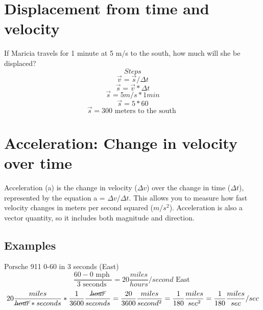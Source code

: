 \documentclass{article}
\theoremstyle{mytheoremstyle}
\theoremstyle{mytheoremstyle}
\theoremstyle{myproblemstyle}
\begin{document}
\section{Displacement from time and velocity}
If Maricia travels for 1 minute at 5 m/s to the south, how much will she be displaced?
$$Steps$$
$$\overrightarrow{v} = \overrightarrow{s}/\Delta{t}$$
$$\overrightarrow{s} = \overrightarrow{v} * \Delta{t}$$
$$\overrightarrow{s} = 5m/s*1min$$
$$\overrightarrow{s} = 5*60$$
$$\overrightarrow{s} = 300 \text { meters to the south }$$
\section{Acceleration: Change in velocity over time}
Acceleration (a) is the change in velocity ($\Delta{v}$) over the change in time ($\Delta{t}$), represented by the equation a = $\Delta{v}/\Delta{t}$. This allows you to measure how fast velocity changes in meters per second squared ($m/s^2$). Acceleration is also a vector quantity, so it includes both magnitude and direction.
\subsection{Examples}
Porsche 911 0-60 in 3 seconds (East)
$$\dfrac{60-0\text{ mph }}{3\text{ seconds }}=20\dfrac{miles}{hours}/second\text{ East }$$
$$20\dfrac{miles}{\cancel{hour}*seconds}*\dfrac{1}{3600}\dfrac{\cancel{hour}}{seconds}=\dfrac{20}{3600}\dfrac{miles}{second^2}=\dfrac{1}{180}\dfrac{miles}{sec^2}=\dfrac{1}{180}\dfrac{miles}{sec}/sec$$
\end{document}

